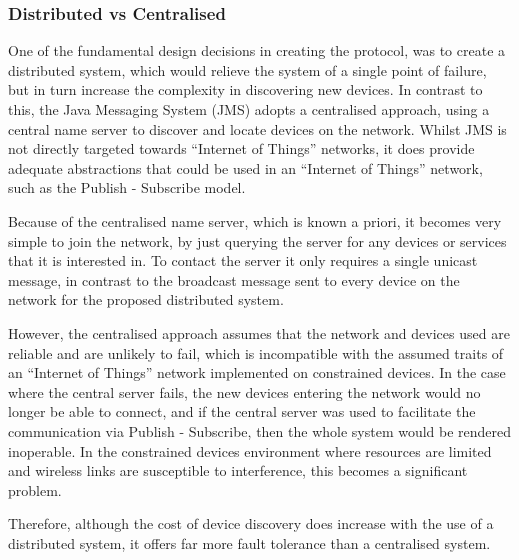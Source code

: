 \subsubsection{Distributed vs Centralised} %
\label{ssub:distributed_vs_centralised}
One of the fundamental design decisions in creating the protocol, was to create a distributed system, which would relieve the system of a single point of failure, but in turn increase the complexity in discovering new devices. In contrast to this, the Java Messaging System (JMS) adopts a centralised approach, using a central name server to discover and locate devices on the network. Whilst JMS is not directly targeted towards ``Internet of Things'' networks, it does provide adequate abstractions that could be used in an ``Internet of Things'' network, such as the Publish - Subscribe model.

Because of the centralised name server, which is known a priori, it becomes very simple to join the network, by just querying the server for any devices or services that it is interested in.  To contact the server it only requires a single unicast message, in contrast to the broadcast message sent to every device on the network for the proposed distributed system. 

However, the centralised approach assumes that the network and devices used are reliable and are unlikely to fail, which is incompatible with the assumed traits of an ``Internet of Things'' network implemented on constrained devices. In the case where the central server fails, the new devices entering the network would no longer be able to connect, and if the central server was used to facilitate the communication via Publish - Subscribe, then the whole system would be rendered inoperable. In the constrained devices environment where resources are limited and wireless links are susceptible to interference, this becomes a significant problem.

Therefore, although the cost of device discovery does increase with the use of a distributed system, it offers far more fault tolerance than a centralised system.


